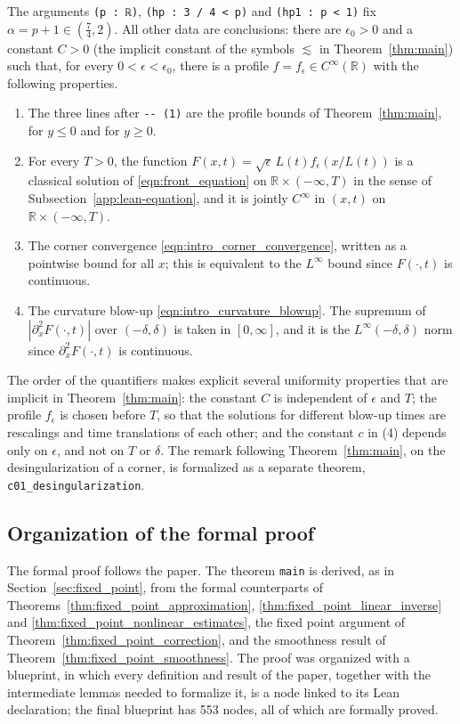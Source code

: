 \documentclass[11pt]{amsart}
\newcommand{\lean}{\lstinline[style=lean]}
\theoremstyle{definition}
\theoremstyle{remark}
\numberwithin{equation}{section}
\begin{document}
The arguments \lean{(p : ℝ)}, \lean{(hp : 3 / 4 < p)} and \lean{(hp1 : p < 1)} fix $\alpha=p+1\in(\frac74,2)$. All other data are conclusions: there are $\epsilon_0>0$ and a constant $C>0$ (the implicit constant of the symbols $\lesssim$ in Theorem~\ref{thm:main}) such that, for every $0<\epsilon<\epsilon_0$, there is a profile $f=f_\epsilon\in C^\infty(\mathbb R)$ with the following properties.
\begin{enumerate}
\item[(1)] The three lines after \lean{-- (1)} are the profile bounds of Theorem~\ref{thm:main}, for $y\le 0$ and for $y\ge 0$.
\item[(2)] For every $T>0$, the function $F(x,t)=\sqrt\epsilon\,L(t)f_\epsilon(x/L(t))$ is a classical solution of \eqref{eqn:front_equation} on $\mathbb R\times(-\infty,T)$ in the sense of Subsection~\ref{app:lean-equation}, and it is jointly $C^\infty$ in $(x,t)$ on $\mathbb R\times(-\infty,T)$.
\item[(3)] The corner convergence \eqref{eqn:intro_corner_convergence}, written as a pointwise bound for all $x$; this is equivalent to the $L^\infty$ bound since $F(\cdot,t)$ is continuous.
\item[(4)] The curvature blow-up \eqref{eqn:intro_curvature_blowup}. The supremum of $|\partial_x^2F(\cdot,t)|$ over $(-\delta,\delta)$ is taken in $[0,\infty]$, and it is the $L^\infty(-\delta,\delta)$ norm since $\partial_x^2F(\cdot,t)$ is continuous.
\end{enumerate}
The order of the quantifiers makes explicit several uniformity properties that are implicit in Theorem~\ref{thm:main}: the constant $C$ is independent of $\epsilon$ and $T$; the profile $f_\epsilon$ is chosen before $T$, so that the solutions for different blow-up times are rescalings and time translations of each other; and the constant $c$ in (4) depends only on $\epsilon$, and not on $T$ or $\delta$. The remark following Theorem~\ref{thm:main}, on the desingularization of a corner, is formalized as a separate theorem, \lean{c01_desingularization}.

\subsection{Organization of the formal proof}\label{app:lean-organization}

The formal proof follows the paper. The theorem \lean{main} is derived, as in Section~\ref{sec:fixed_point}, from the formal counterparts of Theorems~\ref{thm:fixed_point_approximation}, \ref{thm:fixed_point_linear_inverse} and \ref{thm:fixed_point_nonlinear_estimates}, the fixed point argument of Theorem~\ref{thm:fixed_point_correction}, and the smoothness result of Theorem~\ref{thm:fixed_point_smoothness}. The proof was organized with a blueprint, in which every definition and result of the paper, together with the intermediate lemmas needed to formalize it, is a node linked to its Lean declaration; the final blueprint has 553 nodes, all of which are formally proved.
\end{document}
